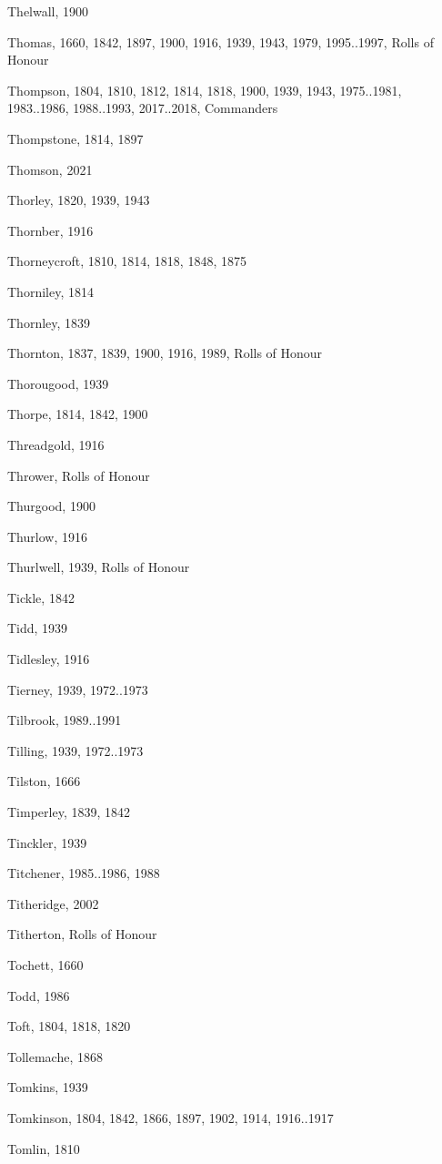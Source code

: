\begin{theindex}
\item Thelwall, 1900
\item Thomas, 1660, 1842, 1897, 1900, 1916, 1939, 1943, 1979, 1995..1997, Rolls of Honour
\item Thompson, 1804, 1810, 1812, 1814, 1818, 1900, 1939, 1943, 1975..1981, 1983..1986, 1988..1993, 2017..2018, Commanders
\item Thompstone, 1814, 1897
\item Thomson, 2021
\item Thorley, 1820, 1939, 1943
\item Thornber, 1916
\item Thorneycroft, 1810, 1814, 1818, 1848, 1875
\item Thorniley, 1814
\item Thornley, 1839
\item Thornton, 1837, 1839, 1900, 1916, 1989, Rolls of Honour
\item Thorougood, 1939
\item Thorpe, 1814, 1842, 1900
\item Threadgold, 1916
\item Thrower, Rolls of Honour
\item Thurgood, 1900
\item Thurlow, 1916
\item Thurlwell, 1939, Rolls of Honour
\item Tickle, 1842
\item Tidd, 1939
\item Tidlesley, 1916
\item Tierney, 1939, 1972..1973
\item Tilbrook, 1989..1991
\item Tilling, 1939, 1972..1973
\item Tilston, 1666
\item Timperley, 1839, 1842
\item Tinckler, 1939
\item Titchener, 1985..1986, 1988
\item Titheridge, 2002
\item Titherton, Rolls of Honour
\item Tochett, 1660
\item Todd, 1986
\item Toft, 1804, 1818, 1820
\item Tollemache, 1868
\item Tomkins, 1939
\item Tomkinson, 1804, 1842, 1866, 1897, 1902, 1914, 1916..1917
\item Tomlin, 1810

\end{theindex}

